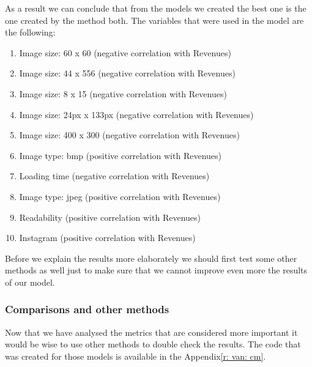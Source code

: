 \documentclass{article}
\begin{document}
As a result we can conclude that from the models we created the best one is the one created by the method both. The variables that were used in the model are the following:
\begin{enumerate}
\item Image size: 60 x 60 (negative correlation with Revenues)
\item Image size: 44 x 556 (negative correlation with Revenues)
\item Image size: 8 x 15 (negative correlation with Revenues)
\item Image size: 24px x 133px (negative correlation with Revenues)
\item Image size: 400 x 300 (negative correlation with Revenues)
\item Image type: bmp (positive correlation with Revenues)
\item Loading time (negative correlation with Revenues)
\item Image type: jpeg (positive correlation with Revenues)
\item Readability (positive correlation with Revenues)
\item Instagram (positive correlation with Revenues) 
\end{enumerate}
Before we explain the results more elaborately we should first test some other methods as well just to make sure that we cannot improve even more the results of our model.
\subsubsection{Comparisons and other methods}
Now that we have analysed the metrics that are considered more important it would be wise to use other methods to double check the results. The code that was created for those models is available in the Appendix\ref{r: van: cm}.
\end{document}

